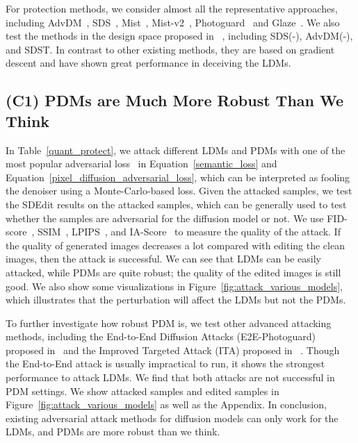 \documentclass{article}
\begin{document}
For protection methods, we consider almost all the representative approaches, including AdvDM~\cite{advdm}, SDS~\cite{sdsattack}, Mist~\cite{liang2023mist}, Mist-v2~\cite{mist-v2}, Photoguard~\cite{salman2023raising} and Glaze~\cite{glaze}. We also test the methods in the design space proposed in ~\cite{sdsattack}, including  SDS(-), AdvDM(-), and SDST. In contrast to other existing methods, they are based on gradient descent and have shown great performance in deceiving the LDMs.






\subsection{(C1) PDMs are Much More Robust Than We Think} 

In Table~\ref{quant_protect}, we attack different LDMs and PDMs with one of the most popular adversarial loss~\cite{mist-v2} in Equation~\ref{semantic_loss} and Equation~\ref{pixel_diffusion_adversarial_loss}, which can be interpreted as fooling the denoiser using a Monte-Carlo-based loss. Given the attacked samples, we test the SDEdit results on the attacked samples, which can be generally used to test whether the samples are adversarial for the diffusion model or not. We use FID-score~\cite{fid}, SSIM~\cite{ssim}, LPIPS~\cite{lpips}, and IA-Score~\cite{la-score} to measure the quality of the attack. If the quality of generated images decreases a lot compared with editing the clean images, then the attack is successful. We can see that LDMs can be easily attacked, while PDMs are quite robust; the quality of the edited images is still good. We also show some visualizations in Figure~\ref{fig:attack_various_models}, which illustrates that the perturbation will affect the LDMs but not the PDMs.

To further investigate how robust PDM is, we test other advanced attacking methods, including the End-to-End Diffusion Attacks (E2E-Photoguard) proposed in~\cite{salman2023raising} and the Improved Targeted Attack (ITA) proposed in ~\cite{mist-v2}. Though the End-to-End attack is usually impractical to run, it shows the strongest performance to attack LDMs.  We find that both attacks are not successful in PDM settings. We show attacked samples and edited samples in Figure~\ref{fig:attack_various_models} as well as the Appendix. In conclusion, existing adversarial attack methods for diffusion models can only work for the LDMs, and PDMs are more robust than we think.
\end{document}
